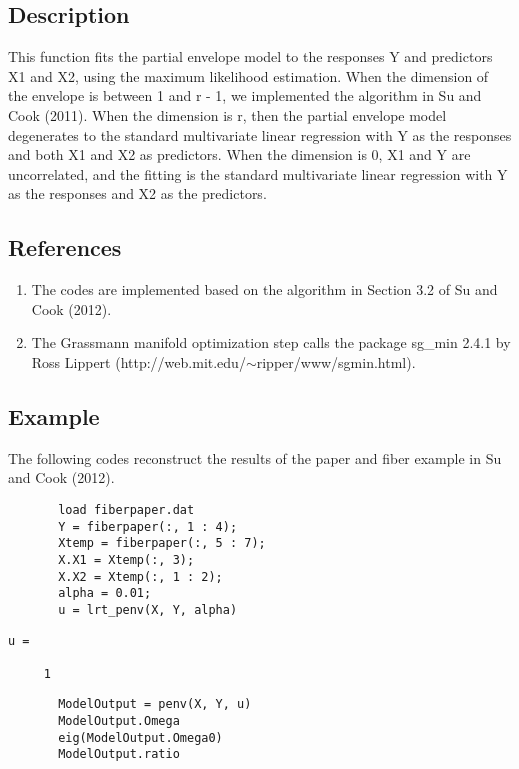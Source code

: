 \documentclass[a4paper,11pt,openany]{memoir}
\begin{document}
\subsection*{Description}

\begin{par}
This function fits the partial envelope model to the responses Y and predictors X1 and X2, using the maximum likelihood estimation.  When the dimension of the envelope is between 1 and r - 1, we implemented the algorithm in Su and Cook (2011).  When the dimension is r, then the partial envelope model degenerates to the standard multivariate linear regression with Y as the responses and both X1 and X2 as predictors.  When the dimension is 0, X1 and Y are uncorrelated, and the fitting is the standard multivariate linear regression with Y as the responses and X2 as the predictors.
\end{par} \vspace{1em}


\subsection*{References}

\begin{enumerate}
\setlength{\itemsep}{-1ex}
   \item The codes are implemented based on the algorithm in Section 3.2 of Su and Cook (2012).
   \item The Grassmann manifold optimization step calls the package sg\_min 2.4.1 by Ross Lippert (http://web.mit.edu/$\sim$ripper/www/sgmin.html).
\end{enumerate}


\subsection*{Example}

\begin{par}
The following codes reconstruct the results of the paper and fiber example in Su and Cook (2012).
\end{par} \vspace{1em}

\begin{verbatim}       load fiberpaper.dat
       Y = fiberpaper(:, 1 : 4);
       Xtemp = fiberpaper(:, 5 : 7);
       X.X1 = Xtemp(:, 3);
       X.X2 = Xtemp(:, 1 : 2);
       alpha = 0.01;
       u = lrt_penv(X, Y, alpha)\end{verbatim}
        \color{lightgray}\ttfamily \begin{verbatim}
u =

     1
\end{verbatim} \rmfamily
\color{black}
       \begin{verbatim}
       ModelOutput = penv(X, Y, u)
       ModelOutput.Omega
       eig(ModelOutput.Omega0)
       ModelOutput.ratio\end{verbatim}
    
\end{document}
